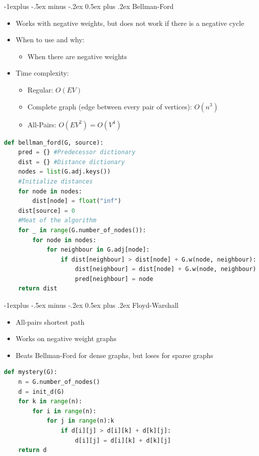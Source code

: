 \documentclass[letterpaper, 8pt]{extarticle}
\makeatletter
\renewcommand{\subsection}{\@startsection{subsection}{2}{0mm}%
                                {-1explus -.5ex minus -.2ex}%
                                {0.5ex plus .2ex}%
                                {\normalfont\small\bfseries}}
\makeatother
\begin{document}
\begin{multicols*}{5}
\subsection{Bellman-Ford}
\begin{itemize}
    \item Works with negative weights, but does not work if there is a negative cycle
    \item When to use and why:
    \begin{itemize}
        \item When there are negative weights
    \end{itemize}
    \item Time complexity: 
        \begin{itemize}
            \item Regular: $O(EV)$
            \item Complete graph (edge between every pair of vertices): $O(n^3)$
            \item All-Pairs: $O(EV^2) = O(V^4)$
        \end{itemize}
\end{itemize}
\begin{lstlisting}[language=Python, breaklines=true, postbreak=\mbox{\textcolor{red}{$\hookrightarrow$}\space}]
def bellman_ford(G, source):
    pred = {} #Predecessor dictionary
    dist = {} #Distance dictionary
    nodes = list(G.adj.keys())
    #Initialize distances
    for node in nodes:
        dist[node] = float("inf")
    dist[source] = 0
    #Meat of the algorithm
    for _ in range(G.number_of_nodes()):
        for node in nodes:
            for neighbour in G.adj[node]:
                if dist[neighbour] > dist[node] + G.w(node, neighbour):
                    dist[neighbour] = dist[node] + G.w(node, neighbour)
                    pred[neighbour] = node
    return dist
\end{lstlisting}

\subsection{Floyd-Warshall}
\begin{itemize}
    \item All-pairs shortest path
    \item Works on negative weight graphs
    \item Beats Bellman-Ford for dense graphs, but loses for sparse graphs
\end{itemize}
\begin{lstlisting}[language=Python]
def mystery(G):
    n = G.number_of_nodes()
    d = init_d(G)
    for k in range(n):
        for i in range(n):
            for j in range(n):k
                if d[i][j] > d[i][k] + d[k][j]: 
                    d[i][j] = d[i][k] + d[k][j]
    return d


\end{lstlisting}
\end{multicols*}
\end{document}
